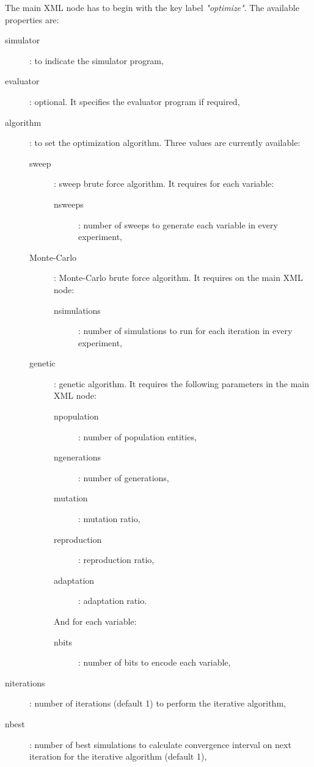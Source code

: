 \documentclass[a4paper]{report}
\begin{document}
The main XML node has to begin with the key label \emph{"optimize"}. The
available properties are:
\begin{description}
	\item[simulator]: to indicate the simulator program,
	\item[evaluator]: optional. It specifies the evaluator program if required,
	\item[algorithm]: to set the optimization algorithm. Three values are
		currently available:
	\begin{description}
		\item[sweep]: sweep brute force algorithm. It requires for each
			variable:
		\begin{description}
			\item[nsweeps]: number of sweeps to generate each variable in every
			experiment,
		\end{description}
	\item[Monte-Carlo]: Monte-Carlo brute force algorithm. It requires on the
		main XML node:
		\begin{description}
			\item[nsimulations]: number of simulations to run for each iteration
				in every experiment,
		\end{description}
	\item[genetic]: genetic algorithm. It requires the following parameters in
		the main XML node:
		\begin{description}
			\item[npopulation]: number of population entities,
			\item[ngenerations]: number of generations,
			\item[mutation]: mutation ratio,
			\item[reproduction]: reproduction ratio,
			\item[adaptation]: adaptation ratio.
		\end{description}
	And for each variable:
		\begin{description}
			\item[nbits]: number of bits to encode each variable,
		\end{description}
	\end{description}
	\item[niterations]: number of iterations (default 1) to perform the
		iterative algorithm,
	\item[nbest]: number of best simulations to calculate convergence interval
		on next iteration for the iterative algorithm (default 1),

\end{description}
\end{document}
